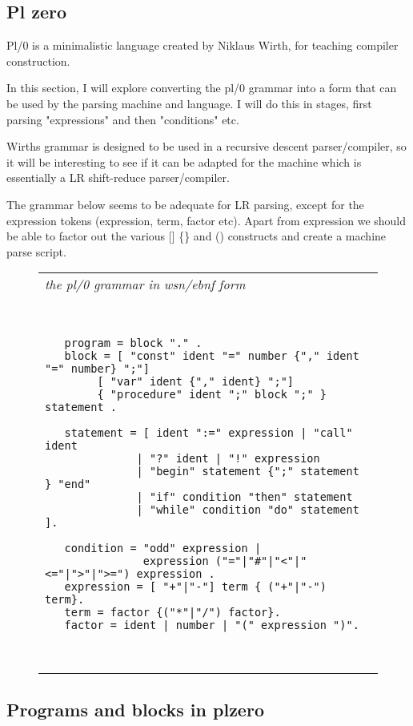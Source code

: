 \documentclass[a4paper,12pt]{article}
\begin{document}
\subsection{Pl zero}

  Pl/0 is a minimalistic language created by Niklaus Wirth, for
  teaching compiler construction.

  In this section, I will explore converting the pl/0 grammar
  into a form that can be used by the parsing machine and
  language. I will do this in stages, first parsing "expressions"
  and then "conditions" etc.
  
  Wirths grammar is designed to be used in a recursive descent
  parser/compiler, so it will be interesting to see if it can be adapted for
  the machine which is essentially a LR shift-reduce parser/compiler.

  The grammar below seems to be adequate for LR parsing, except for
  the expression tokens (expression, term, factor etc). Apart from
  expression we should be able to factor out the various [] \{\} and ()
  constructs and create a machine parse script.
 \begin{figure}
 \begin{tabular}{ l }
 \emph{ the pl/0 grammar in wsn/ebnf form } \\ 
 \begin{lstlisting}[breaklines] 


   program = block "." .
   block = [ "const" ident "=" number {"," ident "=" number} ";"]
        [ "var" ident {"," ident} ";"]
        { "procedure" ident ";" block ";" } statement .

   statement = [ ident ":=" expression | "call" ident 
              | "?" ident | "!" expression 
              | "begin" statement {";" statement } "end" 
              | "if" condition "then" statement 
              | "while" condition "do" statement ].

   condition = "odd" expression |
               expression ("="|"#"|"<"|"<="|">"|">=") expression .
   expression = [ "+"|"-"] term { ("+"|"-") term}.
   term = factor {("*"|"/") factor}.
   factor = ident | number | "(" expression ")".

  
 \end{lstlisting} 
 \end{tabular} 

 \end{figure}
  
  
\subsection{Programs and blocks in plzero}
\end{document}
